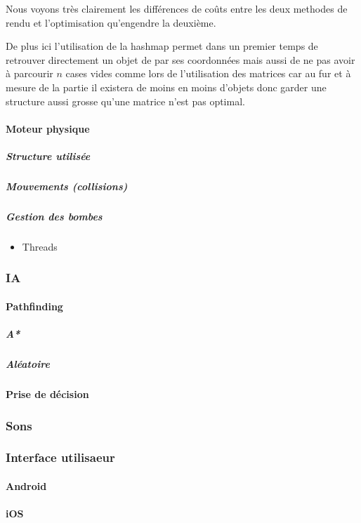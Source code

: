			
			Nous voyons très clairement les différences de coûts entre les deux methodes
			de rendu et l'optimisation qu'engendre la deuxième.
			
			De plus ici l'utilisation de la hashmap permet dans un premier temps de
			retrouver directement un objet de par ses coordonnées mais aussi de ne pas
			avoir à parcourir $n$ cases vides comme lors de l'utilisation des matrices
			car au fur et à mesure de la partie il existera de moins en moins d'objets
			donc garder une structure aussi grosse qu'une matrice n'est pas optimal.
		
		\paragraph{Moteur physique}
		
			\hypertarget{Moteur physique}{}
			\label{Moteur physique}
		
			\subparagraph{Structure utilisée}
			\subparagraph{Mouvements (collisions)}
			\subparagraph{Gestion des bombes}
				\begin{itemize}
					\item{Threads}
				\end{itemize}
	
	\subsubsection{IA}
	
		\hypertarget{IA}{}
		\label{IA}
		
		\paragraph{Pathfinding}
			\subparagraph{A*}
			\subparagraph{Aléatoire}
			\paragraph{Prise de décision}
			

	\subsubsection{Sons}
	
		\hypertarget{Sons}{}
		\label{Sons}
	
	\subsubsection{Interface utilisaeur}
		\paragraph{Android}
		\paragraph{iOS}